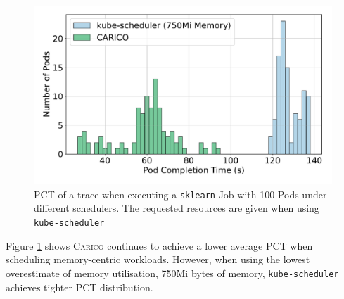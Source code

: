 
\begin{figure}[ht!]
    \centering
    \includegraphics[width=\textwidth]{images/ml-pod-completion.pdf}
    \caption{PCT of a trace when executing a \texttt{sklearn} Job with 100
    Pods under different schedulers. The requested resources are given when
    using \texttt{kube-scheduler}}
    \label{fig:ml-pod-completion}
\end{figure}

Figure \ref{fig:ml-pod-completion} shows \textsc{Carico} continues to achieve a
lower average PCT when scheduling memory-centric workloads.
However, when using the lowest overestimate of memory utilisation, 750Mi bytes
of memory, \texttt{kube-scheduler} achieves tighter PCT distribution.


